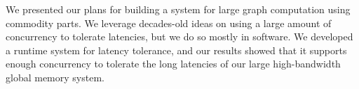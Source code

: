 \documentclass[10pt,nocopyrightspace]{sigplanconf}
\begin{document}
We presented our plans for building a system for large graph
computation using commodity parts. We leverage decades-old ideas on
using a large amount of concurrency to tolerate latencies, but we do
so mostly in software. We developed a runtime system for latency
tolerance, and our results showed that it supports enough concurrency
to tolerate the long latencies of our large high-bandwidth global
memory system.

%

\renewcommand{\bibfont}{\footnotesize}  

\end{document}
